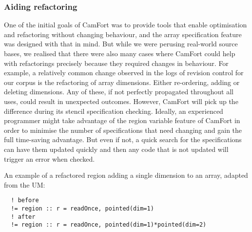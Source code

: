 \subsubsection{Aiding refactoring}

One of the initial goals of CamFort was to provide tools that enable
optimisation and refactoring without changing behaviour, and the
array specification feature was designed with that in mind. But
while we were perusing real-world source bases, we realised that there
were also many cases where CamFort could help with refactorings
precisely because they required changes in behaviour. For example, a
relatively common change observed in the logs of revision control for
our corpus is the refactoring of array dimensions. Either
re-ordering, adding or deleting dimensions. Any of these, if not
perfectly propagated throughout all uses, could result in unexpected
outcomes. However, CamFort will pick up the difference during its
stencil specification checking. Ideally, an experienced programmer might
take advantage of the region variable feature of CamFort in order to
minimise the number of specifications that need changing and gain the
full time-saving advantage. But even if not, a quick search for the
specifications can have them updated quickly and then any code that is
not updated will trigger an error when checked.

An example of a refactored region adding a single dimension to an array, adapted from the UM:
\begin{verbatim}
  ! before
  != region :: r = readOnce, pointed(dim=1)
  ! after
  != region :: r = readOnce, pointed(dim=1)*pointed(dim=2)
\end{verbatim}


